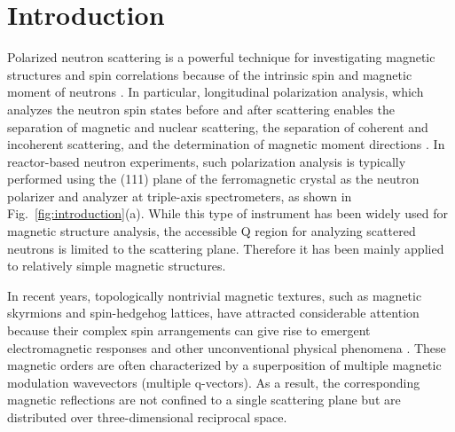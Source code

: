 \documentclass[%
 reprint,
superscriptaddress,
 amsmath,amssymb,
 aps,
]{revtex4-2}
\begin{document}
\section{Introduction}
Polarized neutron scattering is a powerful technique for investigating magnetic structures and spin correlations because of the intrinsic spin and magnetic moment of neutrons \cite{lovesey_theory_1986}.
In particular, longitudinal polarization analysis, which analyzes the neutron spin states before and after scattering enables the separation of magnetic and nuclear scattering, the separation of coherent and incoherent scattering, and the determination of magnetic moment directions \cite{moon_polarization_1969}.
In reactor-based neutron experiments, such polarization analysis is typically performed using the (111) plane of the ferromagnetic crystal  as the neutron polarizer and analyzer at triple-axis spectrometers\cite{kulda_in20_2002,faulhaber_polarized_2010,fernandez-baca_triple-axis_2008,takeda_double_2008,nakajima_polarized_2024}, as shown in Fig.~\ref{fig:introduction}(a).
While this type of instrument has been widely used for magnetic structure analysis, the accessible Q region for analyzing scattered neutrons is limited to the scattering plane.
Therefore it has been mainly applied to relatively simple magnetic structures.

In recent years, topologically nontrivial magnetic textures, such as magnetic skyrmions and spin-hedgehog lattices, have attracted considerable attention because their complex spin arrangements can give rise to emergent electromagnetic responses and other unconventional physical phenomena \cite{muhlbauer_skyrmion_2009,tokura_multiferroics_2014}.
These magnetic orders are often characterized by a superposition of multiple magnetic modulation wavevectors (multiple q-vectors).
As a result, the corresponding magnetic reflections are not confined to a single scattering plane but are distributed over three-dimensional reciprocal space.
\end{document}
